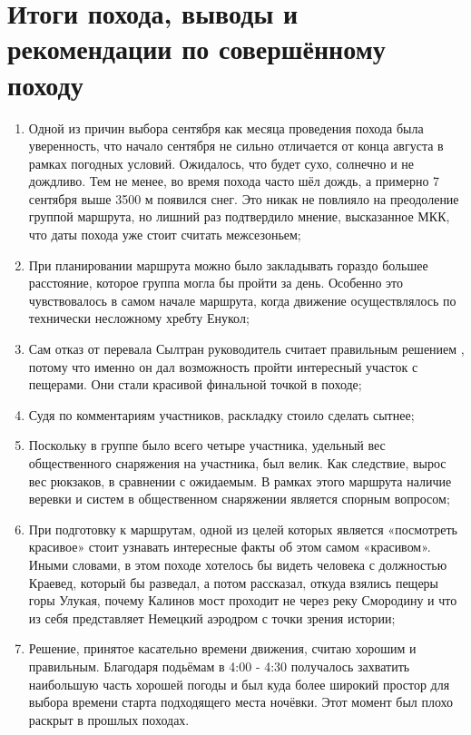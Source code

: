\section{Итоги похода, выводы и рекомендации по совершённому походу}

	\begin{enumerate}
		\item Одной из причин выбора сентября как месяца проведения похода была уверенность, что начало сентября не сильно отличается от конца августа в рамках погодных условий. Ожидалось, что будет сухо, солнечно и не дождливо. Тем не менее, во время похода часто шёл дождь, а примерно 7 сентября выше 3500 м появился снег. Это никак не повлияло на преодоление группой маршрута, но лишний раз подтвердило мнение, высказанное МКК, что даты похода уже стоит считать межсезоньем; %
		\item ﻿﻿﻿При планировании маршрута можно было закладывать гораздо большее расстояние, которое группа могла бы пройти за день. Особенно это чувствовалось в самом начале маршрута, когда движение осуществлялось по технически несложному хребту Енукол;
		\item ﻿﻿﻿Сам отказ от перевала Сылтран руководитель считает правильным решением %
		, потому что именно он дал возможность пройти интересный участок с пещерами. Они стали красивой финальной точкой в походе;
		\item ﻿﻿﻿Судя по комментариям участников, раскладку стоило сделать сытнее;
		﻿\item ﻿﻿Поскольку в группе было всего четыре участника, удельный вес общественного снаряжения на участника, был велик. Как следствие, вырос вес рюкзаков, в сравнении с ожидаемым. В рамках этого маршрута наличие веревки и систем %
		в общественном снаряжении является спорным вопросом;
		\item ﻿﻿﻿При подготовку к маршрутам, одной из целей которых является «посмотреть красивое» стоит узнавать интересные факты об этом самом «красивом». Иными словами, в этом походе хотелось бы видеть человека с должностью Краевед, который бы разведал, а потом рассказал, откуда взялись пещеры горы Улукая, почему Калинов мост проходит не через реку Смородину и что из себя представляет Немецкий аэродром с точки зрения истории;
		\item ﻿﻿﻿Решение, принятое касательно времени движения, считаю хорошим и правильным. Благодаря подьёмам в 4:00 - 4:30 получалось захватить наибольшую часть хорошей погоды и был куда более широкий простор для выбора времени старта подходящего места ночёвки. Этот момент был плохо раскрыт в прошлых походах. %
		
	\end{enumerate} 

	\clearpage